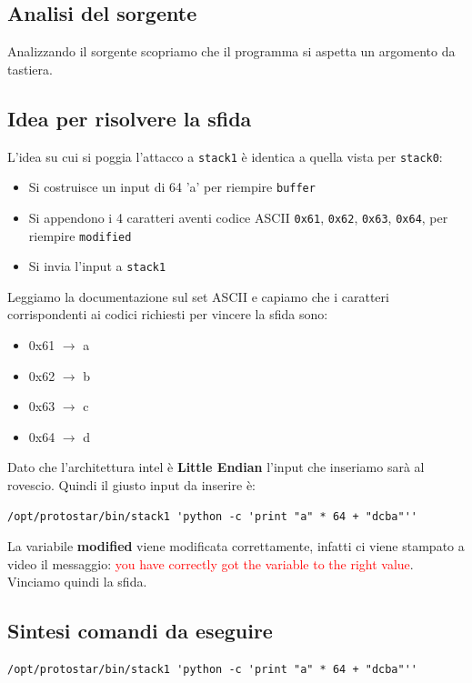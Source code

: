 \subsection{Analisi del sorgente}
Analizzando il sorgente scopriamo che il programma si aspetta un argomento da tastiera.

\subsection{Idea per risolvere la sfida}
L'idea su cui si poggia l'attacco a \texttt{stack1} è identica a quella vista per \texttt{stack0}:
\begin{itemize}
    \item Si costruisce un input di 64 'a' per riempire \texttt{buffer}
    \item Si appendono i 4 caratteri aventi codice ASCII \texttt{0x61}, \texttt{0x62}, \texttt{0x63}, \texttt{0x64}, per riempire \texttt{modified}
    \item Si invia l'input a \texttt{stack1}
\end{itemize}

Leggiamo la documentazione sul set ASCII e capiamo che i caratteri corrispondenti ai codici richiesti per vincere la sfida sono:
\begin{itemize}
    \item 0x61 $\rightarrow$ a
    \item 0x62 $\rightarrow$ b
    \item 0x63 $\rightarrow$ c
    \item 0x64 $\rightarrow$ d
\end{itemize}

Dato che l'architettura intel è \textbf{Little Endian} l'input che inseriamo sarà al rovescio. Quindi il giusto input da inserire è:
\begin{lstlisting}[style=bashstyle]
    /opt/protostar/bin/stack1 'python -c 'print "a" * 64 + "dcba"'' 
\end{lstlisting}
La variabile \textbf{modified} viene modificata correttamente, infatti ci viene stampato a video il messaggio: \textcolor{red}{you have correctly got the variable to the right value}. Vinciamo quindi la sfida.

\subsection{Sintesi comandi da eseguire}
\begin{lstlisting}[style=bashstyle]
    /opt/protostar/bin/stack1 'python -c 'print "a" * 64 + "dcba"'' 
\end{lstlisting}

